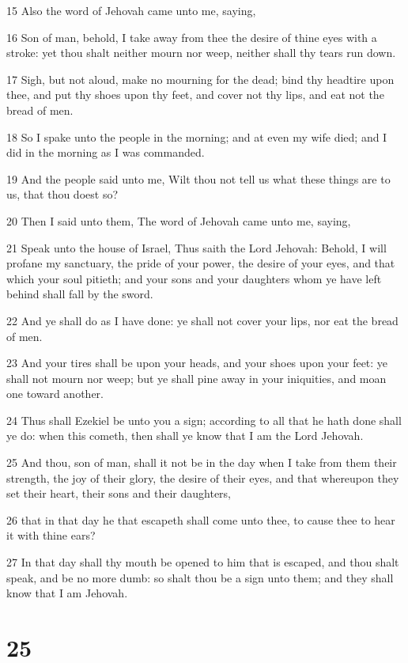 \par 15 Also the word of Jehovah came unto me, saying,
\par 16 Son of man, behold, I take away from thee the desire of thine eyes with a stroke: yet thou shalt neither mourn nor weep, neither shall thy tears run down.
\par 17 Sigh, but not aloud, make no mourning for the dead; bind thy headtire upon thee, and put thy shoes upon thy feet, and cover not thy lips, and eat not the bread of men.
\par 18 So I spake unto the people in the morning; and at even my wife died; and I did in the morning as I was commanded.
\par 19 And the people said unto me, Wilt thou not tell us what these things are to us, that thou doest so?
\par 20 Then I said unto them, The word of Jehovah came unto me, saying,
\par 21 Speak unto the house of Israel, Thus saith the Lord Jehovah: Behold, I will profane my sanctuary, the pride of your power, the desire of your eyes, and that which your soul pitieth; and your sons and your daughters whom ye have left behind shall fall by the sword.
\par 22 And ye shall do as I have done: ye shall not cover your lips, nor eat the bread of men.
\par 23 And your tires shall be upon your heads, and your shoes upon your feet: ye shall not mourn nor weep; but ye shall pine away in your iniquities, and moan one toward another.
\par 24 Thus shall Ezekiel be unto you a sign; according to all that he hath done shall ye do: when this cometh, then shall ye know that I am the Lord Jehovah.
\par 25 And thou, son of man, shall it not be in the day when I take from them their strength, the joy of their glory, the desire of their eyes, and that whereupon they set their heart, their sons and their daughters,
\par 26 that in that day he that escapeth shall come unto thee, to cause thee to hear it with thine ears?
\par 27 In that day shall thy mouth be opened to him that is escaped, and thou shalt speak, and be no more dumb: so shalt thou be a sign unto them; and they shall know that I am Jehovah.

\chapter{25}


